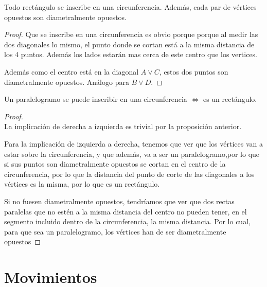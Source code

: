 \begin{nprop}
  Todo rectángulo se inscribe en una circunferencia. Además, cada par de vértices opuestos son diametralmente opuestos.
\end{nprop}

\begin{proof}
	Que se inscribe en una circunferencia es obvio porque porque al medir las dos diagonales lo mismo, el punto donde se cortan está a la misma distancia de los 4 puntos. Además los lados estarán mas cerca de este centro que los vertices.

	Además como el centro está en la diagonal $A\vee C$, estos dos puntos son diametralmente opuestos. Análogo para $B\vee D$.
\end{proof}


\begin{nprop}
  Un paralelogramo se puede inscribir en una circunferencia $\iff$ es un rectángulo.
\end{nprop}

\begin{proof}\hfill\\
	La implicación de derecha a izquierda es trivial por la proposición anterior.

	Para la implicación de izquierda a derecha, tenemos que ver que los vértices van a estar sobre la circunferencia, y que además, va a ser un paralelogramo,por lo que si sus puntos son diametralmente opuestos se cortan en el centro de la circunferencia, por lo que la distancia del punto de corte de las diagonales a los vértices es la misma, por lo que es un rectángulo.

	Si no fuesen diametralmente opuestos, tendríamos que ver que dos rectas paralelas que no estén a la misma distancia del centro no pueden tener, en el segmento incluido dentro de la circunferencia, la misma distancia. Por lo cual, para que sea un paralelogramo, los vértices han de ser diametralmente opuestos
\end{proof}
























\newpage

\section{Movimientos}

